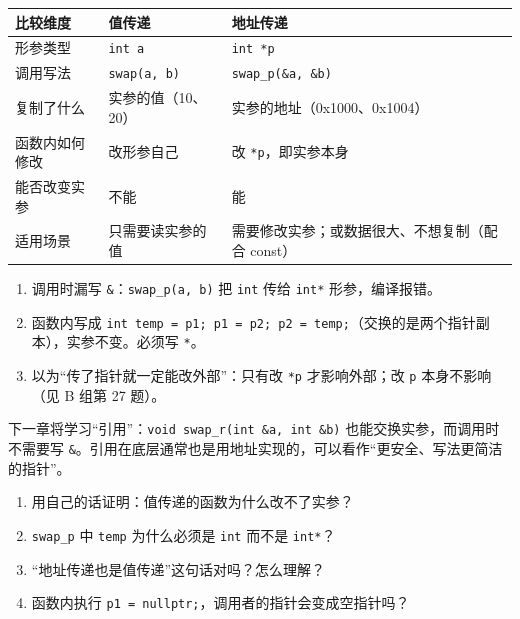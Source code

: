 \documentclass[UTF8,a4paper,11pt,fontset=none,zihao=-4]{ctexart}
\newcommand{\cc}[1]{\texttt{#1}}
\begin{document}
\begin{center}
\noindent\begin{tabularx}{\linewidth}{@{}p{2.5cm}YY@{}}
\toprule
{}比较维度 & 值传递 & 地址传递 \\
\midrule
形参类型 & \cc{int a} & \cc{int *p} \\
调用写法 & \cc{swap(a, b)} & \cc{swap\_p(\&a, \&b)} \\
复制了什么 & 实参的值（10、20） & 实参的地址（0x1000、0x1004） \\
函数内如何修改 & 改形参自己 & 改 \cc{*p}，即实参本身 \\
能否改变实参 & 不能 & 能 \\
适用场景 & 只需要读实参的值 & 需要修改实参；或数据很大、不想复制（配合 const） \\
\bottomrule
\end{tabularx}
\end{center}

\begin{warningbox}
\begin{enumerate}
  \item 调用时漏写 \cc{\&}：\cc{swap\_p(a, b)} 把 \cc{int} 传给 \cc{int*} 形参，编译报错。
  \item 函数内写成 \cc{int temp = p1; p1 = p2; p2 = temp;}（交换的是两个指针副本），实参不变。必须写 \cc{*}。
  \item 以为“传了指针就一定能改外部”：只有改 \cc{*p} 才影响外部；改 \cc{p} 本身不影响（见 B 组第 27 题）。
\end{enumerate}
\end{warningbox}

\begin{extendbox}
下一章将学习“引用”：\cc{void swap\_r(int \&a, int \&b)} 也能交换实参，而调用时不需要写 \cc{\&}。引用在底层通常也是用地址实现的，可以看作“更安全、写法更简洁的指针”。
\end{extendbox}

\begin{checkbox}
\begin{enumerate}[label=\arabic*.,itemsep=0pt]
  \item 用自己的话证明：值传递的函数为什么改不了实参？
  \item \cc{swap\_p} 中 \cc{temp} 为什么必须是 \cc{int} 而不是 \cc{int*}？
  \item “地址传递也是值传递”这句话对吗？怎么理解？
  \item 函数内执行 \cc{p1 = nullptr;}，调用者的指针会变成空指针吗？
\end{enumerate}
\end{checkbox}
\end{document}

